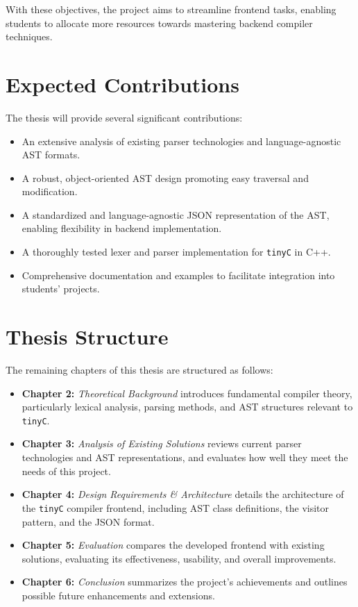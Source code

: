 With these objectives, the project aims to streamline frontend tasks, enabling students to allocate more resources towards mastering backend compiler techniques.

\section{Expected Contributions}

The thesis will provide several significant contributions:

\begin{itemize}
\item An extensive analysis of existing parser technologies and language-agnostic AST formats.
\item A robust, object-oriented AST design promoting easy traversal and modification.
\item A standardized and language-agnostic JSON representation of the AST, enabling flexibility in backend implementation.
\item A thoroughly tested lexer and parser implementation for \texttt{tinyC} in C++.
\item Comprehensive documentation and examples to facilitate integration into students' projects.
\end{itemize}

\section{Thesis Structure}

The remaining chapters of this thesis are structured as follows:

\begin{itemize}
    \item \textbf{Chapter 2:} \textit{Theoretical Background} introduces fundamental compiler theory, particularly lexical analysis, parsing methods, and AST structures relevant to \texttt{tinyC}.
    
    \item \textbf{Chapter 3:} \textit{Analysis of Existing Solutions} reviews current parser technologies and AST representations, and evaluates how well they meet the needs of this project.
    
    \item \textbf{Chapter 4:} \textit{Design Requirements \& Architecture} details the architecture of the \texttt{tinyC} compiler frontend, including AST class definitions, the visitor pattern, and the JSON format.
    
    \item \textbf{Chapter 5:} \textit{Evaluation} compares the developed frontend with existing solutions, evaluating its effectiveness, usability, and overall improvements.
    
    \item \textbf{Chapter 6:} \textit{Conclusion} summarizes the project's achievements and outlines possible future enhancements and extensions.
\end{itemize}

